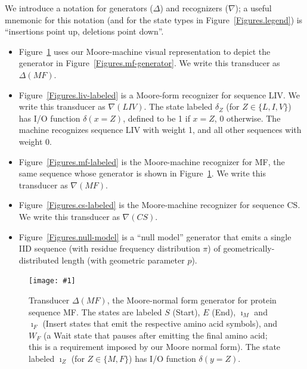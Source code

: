 \documentclass{article}
\newcommand{\figref}[1]{Figure~\ref{Figures.#1}}
\newcommand{\figlabel}[1]{\label{Figures.#1}}
\newcommand{\easyfig}[4]{
\begin{figure}
\texttt{[image: \#1]}
\caption{ \figlabel{#3} #4}
\end{figure}}
\newcommand{\widepdffig}[2]{\easyfig{#1-fig.pdf}{width=\textwidth}{#1}{#2}}
\newcommand\generate{\Delta}
\newcommand\recognize{\nabla}
\begin{document}
We introduce a notation for generators ($\generate$) and recognizers ($\recognize$);
a useful mnemonic for this notation (and for the state types in \figref{legend})
is ``insertions point up, deletions point down''.

\begin{itemize}

\item \figref{moore-mf-generator} uses our Moore-machine visual representation
to depict the generator in \figref{mf-generator}.
We write this transducer as $\generate(MF)$.

\item \figref{liv-labeled} is a Moore-form recognizer for sequence LIV.
We write this transducer as $\recognize(LIV)$.
The state labeled $\delta_Z$  (for $Z \in \{L,I,V\}$) has I/O function $\delta(x=Z)$,
defined to be 1 if $x=Z$, 0 otherwise.
The machine recognizes sequence LIV with weight 1, and all other sequences with weight 0. 

\item \figref{mf-labeled} is the Moore-machine recognizer for MF,
the same sequence whose generator is shown in \figref{moore-mf-generator}.
We write this transducer as $\recognize(MF)$.

\item \figref{cs-labeled} is the Moore-machine recognizer for sequence CS.
We write this transducer as $\recognize(CS)$.

\item \figref{null-model} is a ``null model'' generator that emits a single IID sequence
(with residue frequency distribution $\pi$)
of geometrically-distributed length (with geometric parameter $p$).

\end{itemize}




\widepdffig{moore-mf-generator}{Transducer $\generate(MF)$, the Moore-normal form generator for protein sequence MF.
The states are labeled $S$ (Start), $E$ (End),
$\imath_M$ and $\imath_F$ (Insert states that emit the respective amino acid symbols),
and $W_F$ (a Wait state that pauses after emitting the final amino acid;
this is a requirement imposed by our Moore normal form).
The state labeled $\imath_Z$ (for $Z \in \{M,F\}$) has I/O function $\delta(y=Z)$.}
\end{document}
